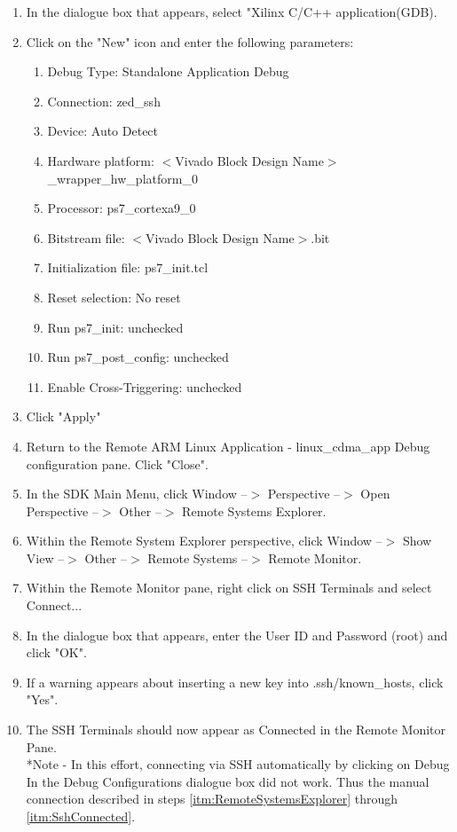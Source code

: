 \documentclass[12pt]{article}
\begin{document}
\begin{enumerate}
\item In the dialogue box that appears, select "Xilinx C/C++ application(GDB).
\item Click on the "New" icon and enter the following parameters:
\begin{enumerate}
\item Debug Type: Standalone Application Debug
\item Connection: zed\_ssh %
\item Device: Auto Detect
\item Hardware platform: $<$Vivado Block Design Name$>$\_wrapper\_hw\_platform\_0
\item Processor: ps7\_cortexa9\_0
\item Bitstream file: $<$Vivado Block Design Name$>$.bit
\item Initialization file: ps7\_init.tcl
\item Reset selection: No reset
\item Run ps7\_init: unchecked
\item Run ps7\_post\_config: unchecked
\item Enable Cross-Triggering: unchecked
\end{enumerate}
\item Click "Apply"
\item Return to the Remote ARM Linux Application - linux\_cdma\_app Debug configuration pane.  Click "Close".
\item In the SDK Main Menu, click Window --$>$ Perspective --$>$ Open Perspective --$>$ Other --$>$ Remote Systems Explorer. \label{itm:RemoteSystemsExplorer}
\item Within the Remote System Explorer perspective, click Window --$>$ Show View --$>$ Other --$>$ Remote Systems --$>$ Remote Monitor.
\item Within the Remote Monitor pane, right click on SSH Terminals and select Connect...
\item In the dialogue box that appears, enter the User ID and Password (root) and click "OK".
\item If a warning appears about inserting a new key into .ssh/known\_hosts, click "Yes".
\item The SSH Terminals should now appear as Connected in the Remote Monitor Pane.\label{itm:SshConnected}
\\ *Note - In this effort, connecting via SSH automatically by clicking on Debug In the Debug Configurations dialogue box did not work.  Thus the manual connection described in steps \ref{itm:RemoteSystemsExplorer} through \ref{itm:SshConnected}.

\end{enumerate}
\end{document}
